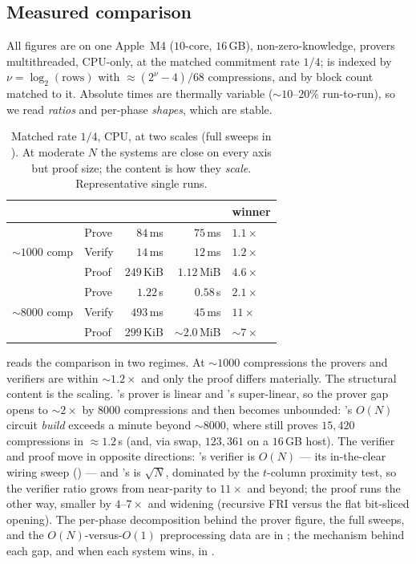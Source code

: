 \subsection{Measured comparison}
\label{sec:results}
\label{sec:res-headline}

All figures are on one Apple~M4 ($10$-core, $16$\,GB), non-zero-knowledge,
provers multithreaded, CPU-only, at the matched commitment rate $1/4$; \zinc{}
is indexed by $\nu=\log_2(\text{rows})$ with ${\approx}(2^\nu-4)/68$
compressions, and \binius{} by block count matched to it. Absolute times are thermally variable
($\sim$$10$--$20\%$ run-to-run), so we read \emph{ratios} and per-phase
\emph{shapes}, which are stable.

\begin{table}[t]
\centering
\renewcommand{\arraystretch}{1.2}
\begin{tabular}{@{}llrrl@{}}
\toprule
& & \binius{} & \zinc{} & winner \\
\midrule
\multirow{3}{*}{$\sim$$1000$ comp}
  & Prove   & $84$\,ms    & $75$\,ms    & \zinc{} $1.1\times$ \\
  & Verify  & $14$\,ms    & $12$\,ms    & \zinc{} $1.2\times$ \\
  & Proof   & $249$\,KiB  & $1.12$\,MiB & \binius{} $4.6\times$ \\
\midrule
\multirow{3}{*}{$\sim$$8000$ comp}
  & Prove   & $1.22$\,s   & $0.58$\,s   & \zinc{} $2.1\times$ \\
  & Verify  & $493$\,ms   & $45$\,ms    & \zinc{} $11\times$ \\
  & Proof   & $299$\,KiB  & $\sim$$2.0$\,MiB & \binius{} $\sim$$7\times$ \\
\bottomrule
\end{tabular}
\caption{Matched rate $1/4$, CPU, at two scales (full sweeps in
). At moderate $N$ the systems are close on every axis but
proof size; the content is how they \emph{scale}. Representative single runs.}
\label{tab:headline}
\end{table}

 reads the comparison in two regimes. At $\sim$$1000$
compressions the provers and verifiers are within $\sim$$1.2\times$ and only the
proof differs materially. The structural content is the scaling. \zinc{}'s
prover is linear and \binius{}'s super-linear, so the prover gap opens to
$\sim$$2\times$ by $8000$ compressions and then becomes unbounded: \binius{}'s
$O(N)$ circuit \emph{build} exceeds a minute beyond $\sim$$8000$, where \zinc{}
still proves $15{,}420$ compressions in $\approx 1.2$\,s (and, via swap,
$123{,}361$ on a $16$\,GB host). The verifier and proof move in opposite
directions: \binius{}'s verifier is $O(N)$ --- its in-the-clear wiring sweep
() --- and \zinc{}'s is $\sqrt N$, dominated by the
$t$-column proximity test, so the verifier ratio grows from near-parity to
$11\times$ and beyond; the proof runs the other way, \binius{} smaller by
$4$--$7\times$ and widening (recursive FRI versus the flat bit-sliced opening).
The per-phase decomposition behind the prover figure, the full sweeps, and the
$O(N)$-versus-$O(1)$ preprocessing data are in ; the mechanism
behind each gap, and when each system wins, in .

